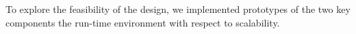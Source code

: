To explore the feasibility of the \flux design, we implemented prototypes
of the two key components the \flux run-time environment with respect to scalability.
%


